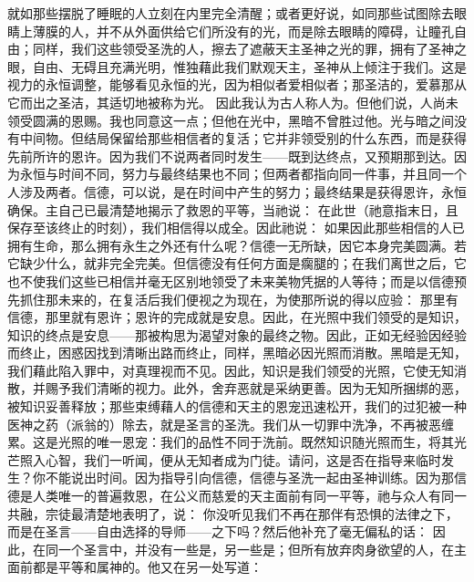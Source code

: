就如那些摆脱了睡眠的人立刻在内里完全清醒；或者更好说，如同那些试图除去眼睛上薄膜的人，并不从外面供给它们所没有的光，而是除去眼睛的障碍，让瞳孔自由；同样，我们这些领受圣洗的人，擦去了遮蔽天主圣神之光的罪，拥有了圣神之眼，自由、无碍且充满光明，惟独藉此我们默观天主，圣神从上倾注于我们。这是视力的永恒调整，能够看见永恒的光，因为相似者爱相似者；那圣洁的，爱慕那从它而出之圣洁，其适切地被称为光。  因此我认为古人称人为。但他们说，人尚未领受圆满的恩赐。我也同意这一点；但他在光中，黑暗不曾胜过他。光与暗之间没有中间物。但结局保留给那些相信者的复活；它并非领受别的什么东西，而是获得先前所许的恩许。因为我们不说两者同时发生——既到达终点，又预期那到达。因为永恒与时间不同，努力与最终结果也不同；但两者都指向同一件事，并且同一个人涉及两者。信德，可以说，是在时间中产生的努力；最终结果是获得恩许，永恒确保。主自己已最清楚地揭示了救恩的平等，当祂说：  在此世（祂意指末日，且保存至该终止的时刻），我们相信得以成全。因此祂说：  如果因此那些相信的人已拥有生命，那么拥有永生之外还有什么呢？信德一无所缺，因它本身完美圆满。若它缺少什么，就非完全完美。但信德没有任何方面是瘸腿的；在我们离世之后，它也不使我们这些已相信并毫无区别地领受了未来美物凭据的人等待；而是以信德预先抓住那未来的，在复活后我们便视之为现在，为使那所说的得以应验：  那里有信德，那里就有恩许；恩许的完成就是安息。因此，在光照中我们领受的是知识，知识的终点是安息——那被构思为渴望对象的最终之物。因此，正如无经验因经验而终止，困惑因找到清晰出路而终止，同样，黑暗必因光照而消散。黑暗是无知，我们藉此陷入罪中，对真理视而不见。因此，知识是我们领受的光照，它使无知消散，并赐予我们清晰的视力。此外，舍弃恶就是采纳更善。因为无知所捆绑的恶，被知识妥善释放；那些束缚藉人的信德和天主的恩宠迅速松开，我们的过犯被一种医神之药（派翁的）除去，就是圣言的圣洗。我们从一切罪中洗净，不再被恶缠累。这是光照的唯一恩宠：我们的品性不同于洗前。既然知识随光照而生，将其光芒照入心智，我们一听闻，便从无知者成为门徒。请问，这是否在指导来临时发生？你不能说出时间。因为指导引向信德，信德与圣洗一起由圣神训练。因为那信德是人类唯一的普遍救恩，在公义而慈爱的天主面前有同一平等，祂与众人有同一共融，宗徒最清楚地表明了，说： 你没听见我们不再在那伴有恐惧的法律之下，而是在圣言——自由选择的导师——之下吗？然后他补充了毫无偏私的话：  因此，在同一个圣言中，并没有一些是，另一些是；但所有放弃肉身欲望的人，在主面前都是平等和属神的。他又在另一处写道：  